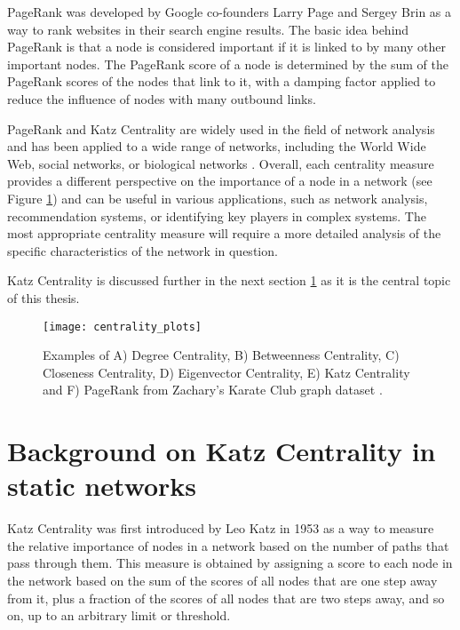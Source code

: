 PageRank was developed by Google co-founders Larry Page and Sergey Brin as a way to rank websites in their search engine results. The basic idea behind PageRank is that a node is considered important if it is linked to by many other important nodes. The PageRank score of a node is determined by the sum of the PageRank scores of the nodes that link to it, with a damping factor applied to reduce the influence of nodes with many outbound links. 

PageRank and Katz Centrality are widely used in the field of network analysis and has been applied to a wide range of networks, including the World Wide Web, social networks, or biological networks \cite{brin1998anatomy,jeong2001lethality,wasserman1994social}. Overall, each centrality measure provides a different perspective on the importance of a node in a network (see Figure \ref{centrality}) and can be useful in various applications, such as network analysis, recommendation systems, or identifying key players in complex systems. The most appropriate centrality measure will require a more detailed analysis of the specific characteristics of the network in question.

Katz Centrality is discussed further in the next section \ref{sec:back} as it is the central topic of this thesis.

\begin{figure}[h]\centering
	\texttt{[image: centrality\_plots]}
	\caption{Examples of A) Degree Centrality, B) Betweenness Centrality, C) Closeness Centrality, D) Eigenvector Centrality, E) Katz Centrality and F) PageRank from Zachary’s Karate Club graph dataset \cite{zachary1977information}.}
	\label{centrality}
	\bigskip
\end{figure}

\section{Background on Katz Centrality in static networks}
\label{sec:back}

Katz Centrality was first introduced by Leo Katz \cite{katz1953new} in 1953 as a way to measure the relative importance of nodes in a network based on the number of paths that pass through them. This measure is obtained by assigning a score to each node in the network based on the sum of the scores of all nodes that are one step away from it, plus a fraction of the scores of all nodes that are two steps away, and so on, up to an arbitrary limit or threshold.

